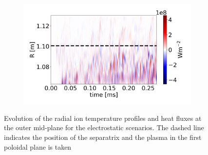 \begin{figure}[H]
\begin{subfigure}[t]{0.45\textwidth}
	\end{subfigure}
	\begin{subfigure}[t]{0.45\textwidth}
		\centering
		\includegraphics[width=1\textwidth]{schemes/plotOMPtime_spec1_fluxE_psi_PHIJ_mass_1.jpg}
	\end{subfigure}
	\caption[Evolution of the radial ion temperature profiles and heat fluxes at the outer mid-plane for the electrostatic scenarios]{Evolution of the radial ion temperature profiles and heat fluxes at the outer mid-plane for the electrostatic scenarios. The dashed line indicates the position of the separatrix and the plasma in the first poloidal plane is taken}
	\label{fig:CIRC_EI_OMPevolution}
\end{figure}


